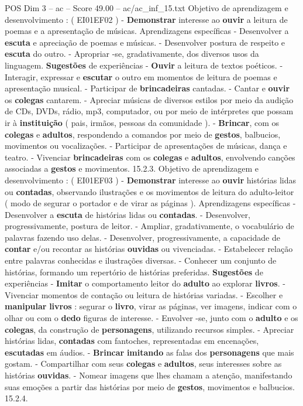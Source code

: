 \begin{textsample}{POS Dim 3 – ac – Score 49.00 – ac/ac\_inf\_15.txt}
Objetivo de aprendizagem e desenvolvimento : ( EI01EF02 ) - \textbf{Demonstrar} interesse ao \textbf{ouvir} a leitura de poemas e a apresentação de músicas.
Aprendizagens específicas - Desenvolver a \textbf{escuta} e apreciação de poemas e músicas. - Desenvolver postura de respeito e \textbf{escuta} do outro. - Apropriar -se, gradativamente, dos diversos usos da linguagem. \textbf{Sugestões} de experiências - \textbf{Ouvir} a leitura de textos poéticos. - Interagir, expressar e \textbf{escutar} o outro em momentos de leitura de poemas e apresentação musical. - Participar de \textbf{brincadeiras} cantadas. - Cantar e \textbf{ouvir} os \textbf{colegas} cantarem. - Apreciar músicas de diversos estilos por meio da audição de CDs, DVDs, rádio, mp3, computador, ou por meio de intérpretes que possam ir à \textbf{instituição} ( pais, irmãos, pessoas da comunidade ). - \textbf{Brincar}, com os \textbf{colegas} e \textbf{adultos}, respondendo a comandos por meio de \textbf{gestos}, balbucios, movimentos ou vocalizações. - Participar de apresentações de músicas, dança e teatro. - Vivenciar \textbf{brincadeiras} com os \textbf{colegas} e \textbf{adultos}, envolvendo canções associadas a \textbf{gestos} e movimentos. 15.2.3.
Objetivo de aprendizagem e desenvolvimento : ( EI01EF03 ) - \textbf{Demonstrar} interesse ao \textbf{ouvir} histórias lidas ou \textbf{contadas}, observando ilustrações e os movimentos de leitura do adulto-leitor ( modo de segurar o portador e de virar as páginas ).
Aprendizagens específicas - Desenvolver a \textbf{escuta} de histórias lidas ou \textbf{contadas}. - Desenvolver, progressivamente, postura de leitor. - Ampliar, gradativamente, o vocabulário de palavras fazendo uso delas. - Desenvolver, progressivamente, a capacidade de \textbf{contar} e/ou recontar as histórias \textbf{ouvidas} ou vivenciadas. - Estabelecer relação entre palavras conhecidas e ilustrações diversas. - Conhecer um conjunto de histórias, formando um repertório de histórias preferidas. \textbf{Sugestões} de experiências - \textbf{Imitar} o comportamento leitor do \textbf{adulto} ao explorar \textbf{livros}. - Vivenciar momentos de contação ou leitura de histórias variadas. - Escolher e \textbf{manipular} \textbf{livros} : segurar o \textbf{livro}, virar as páginas, ver imagens, indicar com o olhar ou com o \textbf{dedo} figuras de interesse. - Envolver -se, junto com o \textbf{adulto} e os \textbf{colegas}, da construção de \textbf{personagens}, utilizando recursos simples. - Apreciar histórias lidas, \textbf{contadas} com fantoches, representadas em encenações, \textbf{escutadas} em áudios. - \textbf{Brincar} \textbf{imitando} as falas dos \textbf{personagens} que mais gostam. - Compartilhar com seus \textbf{colegas} e \textbf{adultos}, seus interesses sobre as histórias \textbf{ouvidas}. - Nomear imagens que lhes chamam a atenção, manifestando suas emoções a partir das histórias por meio de \textbf{gestos}, movimentos e balbucios. 15.2.4.

\end{textsample}

